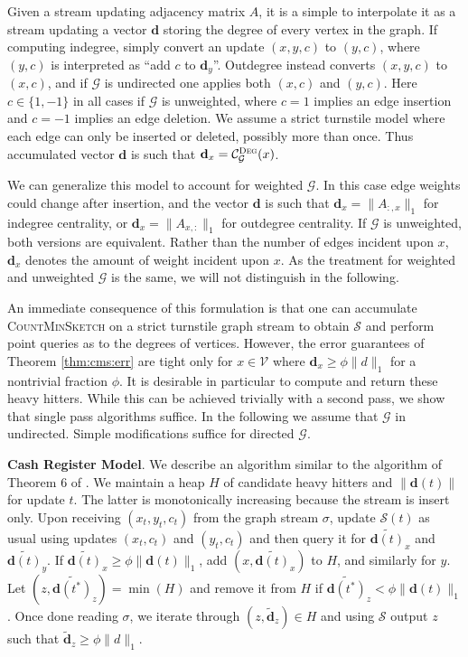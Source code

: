 \documentclass{report}
\newcommand{\algoname}[1]{\textnormal{\textsc{#1}}}
\begin{document}
Given a stream updating adjacency matrix $A$, it is a simple to interpolate it as a stream updating a vector $\mathbf{d}$ storing the degree of every vertex in the graph. 
If computing indegree, simply convert an update $(x,y,c)$ to $(y,c)$, where $(y,c)$ is interpreted as ``add $c$ to $\mathbf{d}_y$''. 
Outdegree instead converts $(x,y,c)$ to $(x,c)$, and if $\mathcal{G}$ is undirected one applies both $(x,c)$ and $(y,c)$. 
Here $c \in \{1, -1\}$ in all cases if $\mathcal{G}$ is unweighted, where $c=1$ implies an edge insertion and $c=-1$ implies an edge deletion.
We assume a strict turnstile model where each edge can only be inserted or deleted, possibly more than once.
Thus accumulated vector $\mathbf{d}$ is such that $\mathbf{d}_x = \mathcal{C}^{\algoname{Deg}}_{\mathcal{G}}(x)$.

We can generalize this model to account for weighted $\mathcal{G}$.
In this case edge weights could change after insertion, and the vector $\mathbf{d}$ is such that $\mathbf{d}_x = \|A_{:,x}\|_1$ for indegree centrality, or $\mathbf{d}_x = \|A_{x,:}\|_1$ for outdegree centrality.
If $\mathcal{G}$ is unweighted, both versions are equivalent.
Rather than the number of edges incident upon $x$, $\mathbf{d}_x$ denotes the amount of weight incident upon $x$. 
As the treatment for weighted and unweighted $\mathcal{G}$ is the same, we will not distinguish in the following. 

An immediate consequence of this formulation is that one can accumulate \algoname{CountMinSketch} on a strict turnstile graph stream to obtain $\mathcal{S}$ and perform point queries as to the degrees of vertices.
However, the error guarantees of Theorem \ref{thm:cms:err} are tight only for $x \in \mathcal{V}$ where $\mathbf{d}_x \geq \phi \|d\|_1$ for a nontrivial fraction $\phi$.
It is desirable in particular to compute and return these heavy hitters.
While this can be achieved trivially with a second pass, we show that single pass algorithms suffice.
In the following we assume that $\mathcal{G}$ in undirected. 
Simple modifications suffice for directed $\mathcal{G}$.

\textbf{Cash Register Model}.
We describe an algorithm similar to the algorithm of Theorem 6 of \cite{cormode2005improved}.
We maintain a heap $H$ of candidate heavy hitters and $\|\mathbf{d}(t)\|$ for update $t$.
The latter is monotonically increasing because the stream is insert only. 
Upon receiving $(x_t, y_t, c_t)$ from the graph stream $\sigma$, update $\mathcal{S}(t)$ as usual using updates $(x_t, c_t)$ and $(y_t, c_t)$ and then query it for $\widetilde{\mathbf{d}(t)}_x$ and $\widetilde{\mathbf{d}(t)}_y$.
If $\widetilde{\mathbf{d}(t)}_x \geq \phi\|\mathbf{d}(t)\|_1$, add $\left ( x, \widetilde{\mathbf{d}(t)}_x \right )$ to $H$, and similarly for $y$.
Let $\left ( z, \widetilde{\mathbf{d}(t^*)}_z \right ) = \min (H)$ and remove it from $H$ if $\widetilde{\mathbf{d}(t^*)}_z < \phi \|\mathbf{d}(t)\|_1$.
Once done reading $\sigma$, we iterate through $\left ( z, \widetilde{\mathbf{d}}_z \right ) \in H$ and using $\mathcal{S}$ output $z$ such that $\widetilde{\mathbf{d}}_z \geq \phi \|d\|_1$.
\end{document}
